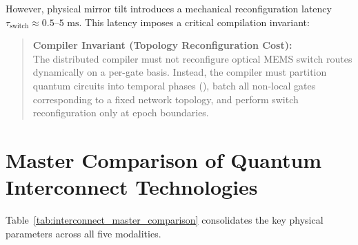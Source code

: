 However, physical mirror tilt introduces a mechanical reconfiguration latency $\tau_{\text{switch}} \approx 0.5\text{--}5\text{ ms}$. This latency imposes a critical compilation invariant:
\begin{quote}
\textbf{Compiler Invariant (Topology Reconfiguration Cost):} \\
The distributed compiler must not reconfigure optical MEMS switch routes dynamically on a per-gate basis. Instead, the compiler must partition quantum circuits into temporal phases (), batch all non-local gates corresponding to a fixed network topology, and perform switch reconfiguration only at epoch boundaries.
\end{quote}


\section{Master Comparison of Quantum Interconnect Technologies}
\label{sec:interconnect_master_comparison}

Table~\ref{tab:interconnect_master_comparison} consolidates the key physical parameters across all five modalities.

